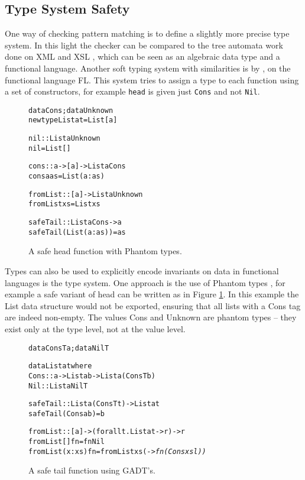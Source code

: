 \documentclass[preprint]{sigplanconf}
\newcommand{\T}[1]{\texttt{#1}}
\newcommand{\C}[1]{\textsf{#1}}
\newenvironment{code}{\begin{alltt}\small}{\end{alltt}}
\begin{document}
\subsection{Type System Safety}

One way of checking pattern matching is to define a slightly more precise type system. In this light the checker can be compared to the tree automata work done on XML and XSL \citep{static_xslt}, which can be seen as an algebraic data type and a functional language. Another soft typing system with similarities is by \citet{aiken:type_infer}, on the functional language FL. This system tries to assign a type to each function using a set of constructors, for example \T{head} is given just \T{Cons} and not \T{Nil}.

\begin{figure}
\begin{code}
data Cons; data Unknown
newtype List a t = List [a]

nil :: List a Unknown
nil = List []

cons :: a -> [a] -> List a Cons
cons a as = List (a:as)

fromList :: [a] -> List a Unknown
fromList xs = List xs

safeTail :: List a Cons -> a
safeTail (List (a:as)) = as
\end{code}
\caption{A safe \C{head} function with Phantom types.}
\label{fig:phantom}
\end{figure}

Types can also be used to explicitly encode invariants on data in functional languages is the type system. One approach is the use of Phantom types \citep{fluet:phantom}, for example a safe variant of \C{head} can be written as in Figure \ref{fig:phantom}. In this example the \C{List} data structure would not be exported, ensuring that all lists with a \C{Cons} tag are indeed non-empty. The values \C{Cons} and \C{Unknown} are phantom types -- they exist only at the type level, not at the value level.

\begin{figure}
\begin{code}
data ConsT a; data NilT

data List a t where
    Cons  :: a -> List a b -> List a (ConsT b)
    Nil   :: List a NilT

safeTail :: List a (ConsT t) -> List a t
safeTail (Cons a b) = b

fromList :: [a] -> (forall t. List a t -> r) -> r
fromList []      fn = fn Nil
fromList (x:xs)  fn = fromList xs (\sl -> fn (Cons x sl))
\end{code}
\caption{A safe \C{tail} function using GADT's.}
\label{fig:gadt}
\end{figure}
\end{document}
